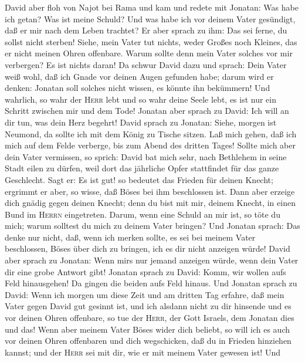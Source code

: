 David aber floh von Najot bei Rama und kam und redete mit
Jonatan: Was habe ich getan? Was ist meine Schuld? Und was habe ich vor
deinem Vater gesündigt, daß er mir nach dem Leben trachtet?
 Er aber sprach zu ihm: Das sei ferne, du sollst nicht
sterben! Siehe, mein Vater tut nichts, weder Großes noch Kleines, das er
nicht meinen Ohren offenbare. Warum sollte denn mein Vater solches vor
mir verbergen? Es ist nichts daran!  Da schwur David dazu
und sprach: Dein Vater weiß wohl, daß ich Gnade vor deinen Augen
gefunden habe; darum wird er denken: Jonatan soll solches nicht wissen,
es könnte ihn bekümmern! Und wahrlich, so wahr der \textsc{Herr} lebt
und so wahr deine Seele lebt, es ist nur ein Schritt zwischen mir und
dem Tode!  Jonatan aber sprach zu David: Ich will an dir
tun, was dein Herz begehrt!  David sprach zu Jonatan:
Siehe, morgen ist Neumond, da sollte ich mit dem König zu Tische sitzen.
Laß mich gehen, daß ich mich auf dem Felde verberge, bis zum Abend des
dritten Tages!  Sollte mich aber dein Vater vermissen, so
sprich: David bat mich sehr, nach Bethlehem in seine Stadt eilen zu
dürfen, weil dort das jährliche Opfer stattfindet für das ganze
Geschlecht.  Sagt er: Es ist gut! so bedeutet das Frieden
für deinen Knecht; ergrimmt er aber, so wisse, daß Böses bei ihm
beschlossen ist.  Dann aber erzeige dich gnädig gegen
deinen Knecht; denn du bist mit mir, deinem Knecht, in einen Bund im
\textsc{Herrn} eingetreten. Darum, wenn eine Schuld an mir ist, so töte
du mich; warum solltest du mich zu deinem Vater bringen? 
Und Jonatan sprach: Das denke nur nicht, daß, wenn ich merken sollte, es
sei bei meinem Vater beschlossen, Böses über dich zu bringen, ich es dir
nicht anzeigen würde!  David aber sprach zu Jonatan: Wenn
mir\textquotesingle s nur jemand anzeigen würde, wenn dein Vater dir
eine grobe Antwort gibt!  Jonatan sprach zu David: Komm,
wir wollen aufs Feld hinausgehen! Da gingen die beiden aufs Feld hinaus.
 Und Jonatan sprach zu David: Wenn ich morgen um diese
Zeit und am dritten Tag erfahre, daß mein Vater gegen David gut gesinnt
ist, und ich alsdann nicht zu dir hinsende und es vor deinen Ohren
offenbare,  so tue der \textsc{Herr}, der Gott Israels,
dem Jonatan dies und das! Wenn aber meinem Vater Böses wider dich
beliebt, so will ich es auch vor deinen Ohren offenbaren und dich
wegschicken, daß du in Frieden hinziehen kannst; und der \textsc{Herr}
sei mit dir, wie er mit meinem Vater gewesen ist!  Und
